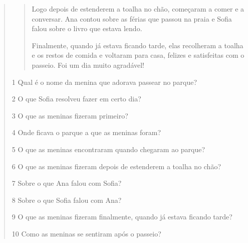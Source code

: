 \begin{quote}
\begin{quote}
Logo depois de estenderem a toalha no chão, começaram a comer e a
conversar. Ana contou sobre as férias que passou na praia e Sofia
falou sobre o livro que estava lendo.

Finalmente, quando já estava ficando tarde, elas recolheram a toalha e
os restos de comida e voltaram para casa, felizes e satisfeitas com o
passeio. Foi um dia muito agradável!

\end{quote}


\num{1} Qual é o nome da menina que adorava passear no parque?



\num{2} O que Sofia resolveu fazer em certo dia?



\num{3} O que as meninas fizeram primeiro?



\num{4} Onde ficava o parque a que as meninas foram?



\num{5} O que as meninas encontraram quando chegaram ao parque?



\num{6} O que as meninas fizeram depois de estenderem a toalha no chão?



\num{7} Sobre o que Ana falou com Sofia?



\num{8} Sobre o que Sofia falou com Ana?



\num{9} O que as meninas fizeram finalmente, quando já estava ficando tarde?



\num{10} Como as meninas se sentiram após o passeio?




\end{quote}

